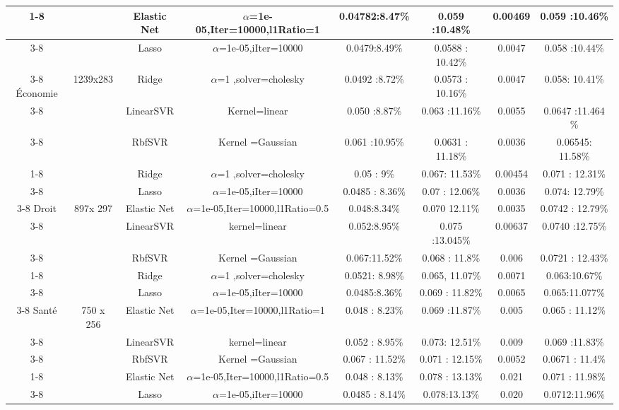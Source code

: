 \begin{table} [!htbp]
{{\begin{tabular}{|c|c|c|c|c|c|c|c|}
		\cline{1-8}
		\hline
		\multirow{5}{*}{}
		&&Elastic Net&${\alpha}$=1e-05,Iter=10000,l1Ratio=1&0.04782:8.47\%&0.059 :10.48\%&0.00469&0.059 :10.46\% \\
		\cline{3-8}
		&&Lasso&${\alpha}$=1e-05,iIter=10000&0.0479:8.49\%&0.0588 : 10.42\%& 0.0047&0.058 :10.44\% \\
		\cline{3-8}
		Économie&{1239x283}&Ridge&${\alpha}$=1 ,solver=cholesky&0.0492 :8.72\% &0.0573 : 10.16\%& 0.0047&0.058: 10.41\% \\
		\cline{3-8}
		&&LinearSVR&Kernel=linear&0.050 :8.87\%&0.063 :11.16\%&0.0055& 0.0647 :11.464 \%\\
		\cline{3-8}
		&&RbfSVR&Kernel =Gaussian&0.061 :10.95\%&0.0631 : 11.18\%&0.0036& 0.06545: 11.58\%\\
		\cline{1-8}
		\hline
		\multirow{5}{*}{}
		&&Ridge&${\alpha}$=1 ,solver=cholesky&0.05 : 9\% &0.067: 11.53\%& 0.00454&0.071 : 12.31\% \\
		\cline{3-8}
		&&Lasso&${\alpha}$=1e-05,iIter=10000&0.0485 : 8.36\%&0.07 : 12.06\%&0.0036&  0.074: 12.79\%\\
		\cline{3-8}
		Droit&897x 297&Elastic Net&${\alpha}$=1e-05,Iter=10000,l1Ratio=0.5&0.048:8.34\%&0.070
		12.11\%
		&0.0035& 0.0742 : 12.79\%\\
		\cline{3-8}
		&&LinearSVR&kernel=linear&0.052:8.95\%&0.075 :13.045\%&0.00637&0.0740 :12.75\%\\
		\cline{3-8}
		&&RbfSVR&Kernel =Gaussian&0.067:11.52\%&0.068 : 11.8\% &0.006& 0.0721 : 12.43\%\\
		\cline{1-8}
		\hline
		\multirow{5}{*}{}
		&&Ridge&${\alpha}$=1 ,solver=cholesky&0.0521: 8.98\% &0.065, 11.07\% & 0.0071&0.063:10.67\% \\
		\cline{3-8}
		&&Lasso&${\alpha}$=1e-05,iIter=10000&0.0485:8.36\%&0.069 : 11.82\%&0.0065& 0.065:11.077\%\\
		\cline{3-8}
		Santé&750 x 256&Elastic Net&${\alpha}$=1e-05,Iter=10000,l1Ratio=1&0.048 : 8.23\%&0.069 :11.87\% &0.005&0.065 : 11.12\% \\
		\cline{3-8}
		&&LinearSVR&kernel=linear&0.052 : 8.95\%&0.073: 12.51\%& 0.009&0.069 :11.83\% \\
		\cline{3-8}
		&&RbfSVR&Kernel =Gaussian&0.067 : 11.52\%&0.071 : 12.15\%&0.0052&0.0671 : 11.4\% \\
		\cline{1-8}
		\hline
		\multirow{5}{*}{}
		&&Elastic Net&${\alpha}$=1e-05,Iter=10000,l1Ratio=0.5&0.048 : 8.13\%&0.078 : 13.13\%&0.021&0.071 : 11.98\% \\
		\cline{3-8}
		&&Lasso&${\alpha}$=1e-05,iIter=10000&0.0485 :  8.14\%&0.078:13.13\%&0.020& 0.0712:11.96\%\\

\end{tabular}}}
\end{table}
